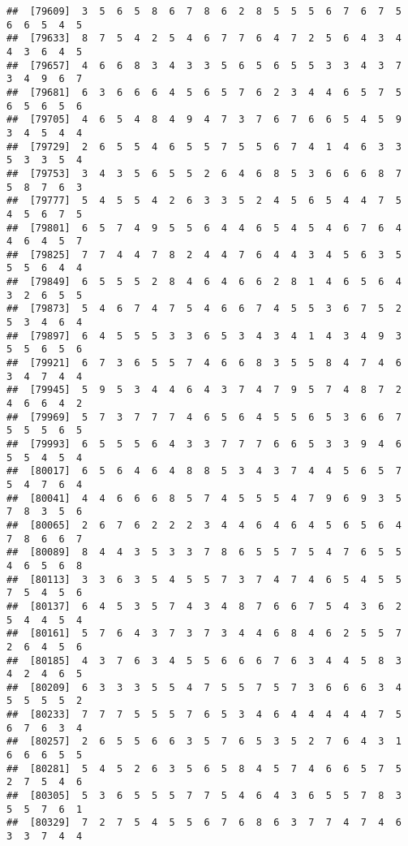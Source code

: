 \documentclass[
]{book}
\begin{document}
\begin{verbatim}
##  [79609]  3  5  6  5  8  6  7  8  6  2  8  5  5  5  6  7  6  7  5  6  6  5  4  5
##  [79633]  8  7  5  4  2  5  4  6  7  7  6  4  7  2  5  6  4  3  4  4  3  6  4  5
##  [79657]  4  6  6  8  3  4  3  3  5  6  5  6  5  5  3  3  4  3  7  3  4  9  6  7
##  [79681]  6  3  6  6  6  4  5  6  5  7  6  2  3  4  4  6  5  7  5  6  5  6  5  6
##  [79705]  4  6  5  4  8  4  9  4  7  3  7  6  7  6  6  5  4  5  9  3  4  5  4  4
##  [79729]  2  6  5  5  4  6  5  5  7  5  5  6  7  4  1  4  6  3  3  5  3  3  5  4
##  [79753]  3  4  3  5  6  5  5  2  6  4  6  8  5  3  6  6  6  8  7  5  8  7  6  3
##  [79777]  5  4  5  5  4  2  6  3  3  5  2  4  5  6  5  4  4  7  5  4  5  6  7  5
##  [79801]  6  5  7  4  9  5  5  6  4  4  6  5  4  5  4  6  7  6  4  4  6  4  5  7
##  [79825]  7  7  4  4  7  8  2  4  4  7  6  4  4  3  4  5  6  3  5  5  5  6  4  4
##  [79849]  6  5  5  5  2  8  4  6  4  6  6  2  8  1  4  6  5  6  4  3  2  6  5  5
##  [79873]  5  4  6  7  4  7  5  4  6  6  7  4  5  5  3  6  7  5  2  5  3  4  6  4
##  [79897]  6  4  5  5  5  3  3  6  5  3  4  3  4  1  4  3  4  9  3  5  5  6  5  6
##  [79921]  6  7  3  6  5  5  7  4  6  6  8  3  5  5  8  4  7  4  6  3  4  7  4  4
##  [79945]  5  9  5  3  4  4  6  4  3  7  4  7  9  5  7  4  8  7  2  4  6  6  4  2
##  [79969]  5  7  3  7  7  7  4  6  5  6  4  5  5  6  5  3  6  6  7  5  5  5  6  5
##  [79993]  6  5  5  5  6  4  3  3  7  7  7  6  6  5  3  3  9  4  6  5  5  4  5  4
##  [80017]  6  5  6  4  6  4  8  8  5  3  4  3  7  4  4  5  6  5  7  5  4  7  6  4
##  [80041]  4  4  6  6  6  8  5  7  4  5  5  5  4  7  9  6  9  3  5  7  8  3  5  6
##  [80065]  2  6  7  6  2  2  2  3  4  4  6  4  6  4  5  6  5  6  4  7  8  6  6  7
##  [80089]  8  4  4  3  5  3  3  7  8  6  5  5  7  5  4  7  6  5  5  4  6  5  6  8
##  [80113]  3  3  6  3  5  4  5  5  7  3  7  4  7  4  6  5  4  5  5  7  5  4  5  6
##  [80137]  6  4  5  3  5  7  4  3  4  8  7  6  6  7  5  4  3  6  2  5  4  4  5  4
##  [80161]  5  7  6  4  3  7  3  7  3  4  4  6  8  4  6  2  5  5  7  2  6  4  5  6
##  [80185]  4  3  7  6  3  4  5  5  6  6  6  7  6  3  4  4  5  8  3  4  2  4  6  5
##  [80209]  6  3  3  3  5  5  4  7  5  5  7  5  7  3  6  6  6  3  4  5  5  5  5  2
##  [80233]  7  7  7  5  5  5  7  6  5  3  4  6  4  4  4  4  4  7  5  6  7  6  3  4
##  [80257]  2  6  5  5  6  6  3  5  7  6  5  3  5  2  7  6  4  3  1  6  6  6  5  5
##  [80281]  5  4  5  2  6  3  5  6  5  8  4  5  7  4  6  6  5  7  5  2  7  5  4  6
##  [80305]  5  3  6  5  5  5  7  7  5  4  6  4  3  6  5  5  7  8  3  5  5  7  6  1
##  [80329]  7  2  7  5  4  5  5  6  7  6  8  6  3  7  7  4  7  4  6  3  3  7  4  4

\end{verbatim}
\end{document}
